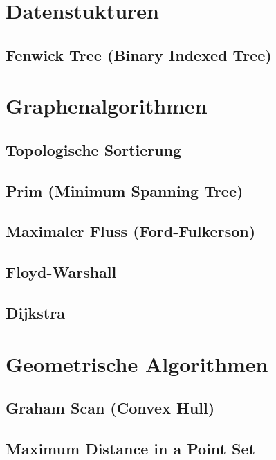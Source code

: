 \documentclass[10pt,a4paper,ngerman]{article}
\begin{document}
\section{Datenstukturen}
\subsection{Fenwick Tree (Binary Indexed Tree)}


\section{Graphenalgorithmen}
\subsection{Topologische Sortierung}

\subsection{Prim (Minimum Spanning Tree)}

\subsection{Maximaler Fluss (Ford-Fulkerson)}


\subsection{Floyd-Warshall}

\subsection{Dijkstra}


\section{Geometrische Algorithmen}
\subsection{Graham Scan (Convex Hull)}

\subsection{Maximum Distance in a Point Set}

\end{document}
